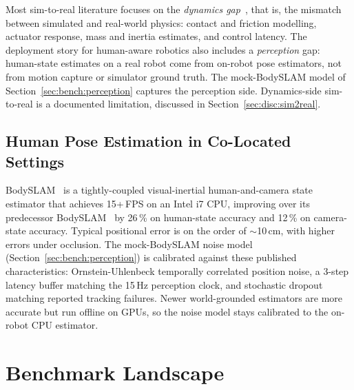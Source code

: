 \documentclass[11pt,a4paper]{report}
\newcommand{\bodyslampp}{BodySLAM\nolinebreak[4]\hspace{-.05em}\raisebox{.2ex}{\scriptsize ++}}
\begin{document}
Most sim-to-real literature focuses on the \emph{dynamics
gap}~\cite{tobin2017domainrand},
that is, the
mismatch between simulated and real-world physics: contact and
friction modelling, actuator response, mass and inertia estimates,
and control latency. The deployment
story for human-aware robotics also includes a \emph{perception}
gap: human-state estimates on a real robot come from on-robot pose
estimators, not from motion capture or simulator ground truth. The
mock-\bodyslampp{} model of Section~\ref{sec:bench:perception}
captures the perception side. Dynamics-side sim-to-real is a
documented limitation, discussed in Section~\ref{sec:disc:sim2real}.

\subsection{Human Pose Estimation in Co-Located Settings}
\label{sec:bg:sim2real:pose}

\bodyslampp{}~\cite{henning2023bodyslampp} is a tightly-coupled
visual-inertial human-and-camera state estimator that achieves
15+\,FPS on an Intel i7 CPU, improving over its predecessor
BodySLAM~\cite{henning2022bodyslam} by 26\,\% on human-state
accuracy and 12\,\% on camera-state accuracy. Typical positional
error is on the order of $\sim$10\,cm, with higher errors under
occlusion. The mock-\bodyslampp{} noise model
(Section~\ref{sec:bench:perception}) is calibrated against these
published characteristics: Ornstein-Uhlenbeck temporally correlated
position noise, a 3-step latency buffer matching the 15\,Hz
perception clock, and stochastic dropout matching reported tracking
failures. Newer world-grounded estimators are more accurate but run
offline on GPUs, so the noise model stays calibrated to the on-robot
CPU estimator.

\section{Benchmark Landscape}
\label{sec:bg:bench}
\end{document}
